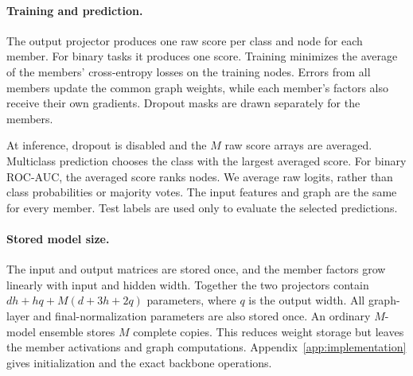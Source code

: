 \paragraph{Training and prediction.}
The output projector produces one raw score per class and node for each member. For binary tasks it produces one score. Training minimizes the average of the members' cross-entropy losses on the training nodes. Errors from all members update the common graph weights, while each member's factors also receive their own gradients. Dropout masks are drawn separately for the members.

At inference, dropout is disabled and the $M$ raw score arrays are averaged. Multiclass prediction chooses the class with the largest averaged score. For binary ROC-AUC, the averaged score ranks nodes. We average raw logits, rather than class probabilities or majority votes. The input features and graph are the same for every member. Test labels are used only to evaluate the selected predictions.

\paragraph{Stored model size.}
The input and output matrices are stored once, and the member factors grow linearly with input and hidden width. Together the two projectors contain $dh+hq+M(d+3h+2q)$ parameters, where $q$ is the output width. All graph-layer and final-normalization parameters are also stored once. An ordinary $M$-model ensemble stores $M$ complete copies. This reduces weight storage but leaves the member activations and graph computations. Appendix~\ref{app:implementation} gives initialization and the exact backbone operations.

